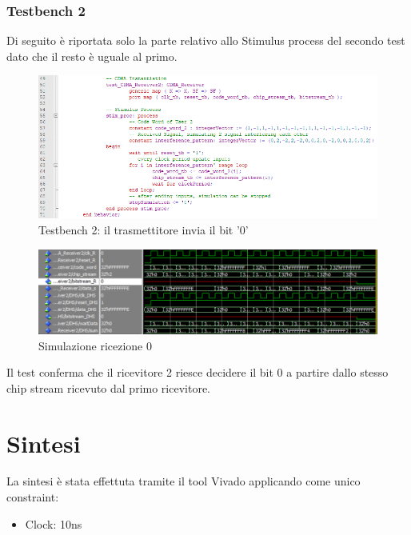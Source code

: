 \documentclass[a4paper,12pt]{article}
\begin{document}
    \subsubsection{Testbench 2}
    Di seguito è riportata solo la parte relativo allo Stimulus process del secondo test dato che il resto è uguale al primo.
    \begin{figure}[H]
      \centering
      \includegraphics[scale=0.7]{img/TB2.png}
      \caption{Testbench 2: il trasmettitore invia il bit '0'}
      \label{fig:vhdl:tb2}
    \end{figure}

    \begin{figure}[H]
      \centering
      \includegraphics[width=\textwidth]{img/Wave2.png}
      \caption{Simulazione ricezione 0}
      \label{fig:vhdl:wave2}
    \end{figure}
    Il test conferma che il ricevitore 2 riesce decidere il bit 0 a partire dallo stesso chip stream ricevuto dal primo 
    ricevitore. 

\section{Sintesi} 
  La sintesi è stata effettuta tramite il tool Vivado applicando come unico constraint:
  \begin{itemize}
    \item{Clock: 10ns}
  \end{itemize}
\end{document}
